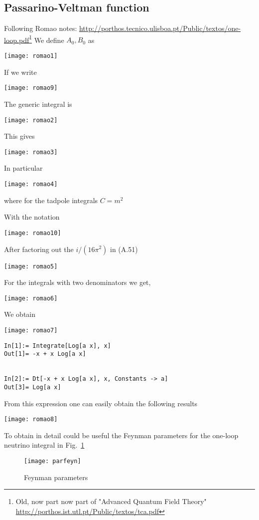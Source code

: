 \subsection{Passarino-Veltman function}
Following Romao notes: \url{http://porthos.tecnico.ulisboa.pt/Public/textos/one-loop.pdf}\footnote{Old, now part now part of "Advanced Quantum Field Theory" \url{http://porthos.ist.utl.pt/Public/textos/tca.pdf}} We define $A_0, B_0$ as

\texttt{[image: romao1]}

If we write

\texttt{[image: romao9]}

The generic integral is 

\texttt{[image: romao2]}

This gives

\texttt{[image: romao3]}

In particular

\texttt{[image: romao4]}

where for the tadpole integrals $C=m^2$

With the notation

\texttt{[image: romao10]}



After factoring out the $i/\left( 16\pi^2 \right)$ in (A.51)

\texttt{[image: romao5]}

For the integrals with two denominators we get,

\texttt{[image: romao6]}


We obtain

\texttt{[image: romao7]}

\begin{verbatim}
In[1]:= Integrate[Log[a x], x]
Out[1]= -x + x Log[a x]


In[2]:= Dt[-x + x Log[a x], x, Constants -> a]
Out[3]= Log[a x]
\end{verbatim}
From this expression one can easily obtain the following results

\texttt{[image: romao8]}


To obtain in detail could be useful the Feynman parameters for the one-loop neutrino integral in Fig.~\ref{fig:fp}

\begin{figure}
  \centering
  \texttt{[image: parfeyn]}
  \caption{Feynman parameters}
  \label{fig:fp}
\end{figure}



